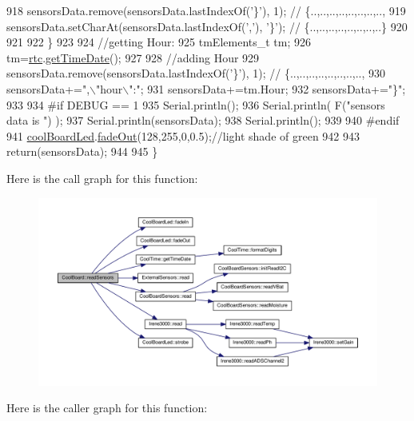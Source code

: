 \begin{DoxyCode}
918         sensorsData.remove(sensorsData.lastIndexOf(\textcolor{charliteral}{'\}'}), 1); \textcolor{comment}{// \{..,..,..,..,..,..,..,..,}
919         sensorsData.setCharAt(sensorsData.lastIndexOf(\textcolor{charliteral}{','}), \textcolor{charliteral}{'\}'}); \textcolor{comment}{// \{..,..,..,..,..,..,..,..\}      }
920         
921         
922     \}
923 
924     \textcolor{comment}{//getting Hour:}
925     tmElements\_t tm;
926     tm=\hyperlink{classCoolBoard_a50d2a6716879d64a85f3c6b44ad63275}{rtc}.\hyperlink{classCoolTime_a7a7501c5ca77dd1248bea704c44f986c}{getTimeDate}();
927     
928     \textcolor{comment}{//adding Hour}
929     sensorsData.remove(sensorsData.lastIndexOf(\textcolor{charliteral}{'\}'}), 1); \textcolor{comment}{// \{..,..,..,..,..,..,..,..,   }
930     sensorsData+=\textcolor{stringliteral}{",\(\backslash\)"hour\(\backslash\)":"};  
931     sensorsData+=tm.Hour;
932     sensorsData+=\textcolor{stringliteral}{"\}"};
933     
934 \textcolor{preprocessor}{#if DEBUG == 1}
935     Serial.println();
936     Serial.println( F(\textcolor{stringliteral}{"sensors data is "}) );
937     Serial.println(sensorsData);
938     Serial.println();
939 
940 \textcolor{preprocessor}{#endif}
941     \hyperlink{classCoolBoard_a1b1d3c684a5baa56b08486e192fd8e97}{coolBoardLed}.\hyperlink{classCoolBoardLed_a93d545679237e8cc858324367149775c}{fadeOut}(128,255,0,0.5);\textcolor{comment}{//light shade of green}
942 
943     \textcolor{keywordflow}{return}(sensorsData);
944 
945 \}
\end{DoxyCode}
Here is the call graph for this function\+:\nopagebreak
\begin{figure}[H]
\begin{center}
\leavevmode
\includegraphics[width=350pt]{classCoolBoard_ad03abdce2e65f520bbf2cff0f2d083cf_cgraph}
\end{center}
\end{figure}
Here is the caller graph for this function\+:\nopagebreak
